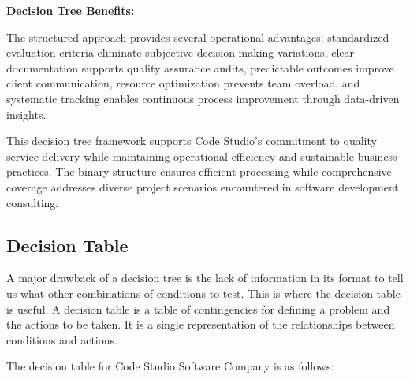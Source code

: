\documentclass[12pt,a4paper]{article}
\begin{document}
\textbf{Decision Tree Benefits:}

The structured approach provides several operational advantages: standardized evaluation criteria eliminate subjective decision-making variations, clear documentation supports quality assurance audits, predictable outcomes improve client communication, resource optimization prevents team overload, and systematic tracking enables continuous process improvement through data-driven insights.

This decision tree framework supports Code Studio's commitment to quality service delivery while maintaining operational efficiency and sustainable business practices. The binary structure ensures efficient processing while comprehensive coverage addresses diverse project scenarios encountered in software development consulting.

\subsection{Decision Table}

A major drawback of a decision tree is the lack of information in its format to tell us what other combinations of conditions to test. This is where the decision table is useful. A decision table is a table of contingencies for defining a problem and the actions to be taken. It is a single representation of the relationships between conditions and actions.

The decision table for Code Studio Software Company is as follows:
\end{document}
